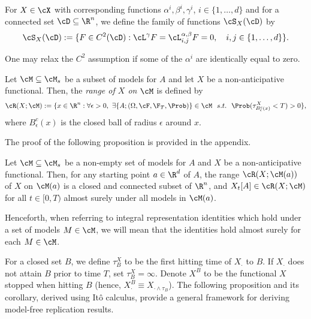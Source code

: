 \documentclass[11pt]{article}
\begin{document}
\begin{definition}
\label{definition: solution set to system of PDEs}
For $X \in \cX$ with corresponding functions $\alpha^i, \beta^i, \gamma^i$, $i \in \{1,\ldots,d\}$ and for a connected set $\cD \subseteq \R^n$, we define the family of functions $\cS_X(\cD)$ by
$$
\cS_X(\cD) := \{F \in C^2(\cD):  \cL^{\gamma} F = \cL^{\alpha,\beta}_{i,j} F = 0, \quad i,j \in \{1,\ldots,d\} \}.
$$
\end{definition}

One may relax the $C^2$ assumption if some of the $\alpha^i$ are identically equal to zero. 

\begin{definition}
\label{definition: range of X}
Let $\cM \subseteq \cM_s$ be a subset of models for $A$ and let $X$ be a non-anticipative functional. Then, the \textit{range of $X$ on $\cM$} is defined by 
$$
\cR(X; \cM) := \{ x \in \R^n : \forall \epsilon > 0, \ \exists \{A; (\Omega, \cF, \F_T, \Prob)\} \in \cM \ \ s.t. \ \ \Prob(\tau^X_{B^c_\epsilon(x)} < T) > 0 \},
$$
where $B^c_\epsilon(x)$ is the closed ball of radius $\epsilon$ around $x$.
\end{definition}

The proof of the following proposition is provided in the appendix.

\begin{proposition}
\label{proposition: properties of range of X}
Let $\cM \subseteq \cM_s$ be a non-empty set of models for $A$ and $X$ be a non-anticipative functional. Then, for any starting point $a \in \R^d$ of $A$, the range $\cR(X; \cM(a))$ of $X$ on $\cM(a)$ is a closed and connected subset of $\R^n$, and $X_t[A] \in \cR(X; \cM)$ for all $t \in [0,T)$ almost surely under all models in $\cM(a)$.
\end{proposition}

Henceforth, when referring to integral representation identities which hold under a set of models $M \in \cM$, we will mean that the identities hold almost surely for each $M \in \cM$. 

For a closed set $B$, we define $\tau^X_B$ to be the first hitting time of $X_\cdot$ to $B$. If $X_\cdot$ does not attain $B$ prior to time $T$, set $\tau^X_B = \infty$. Denote $X^B$ to be the functional $X$ stopped when hitting $B$ (hence, $X^B_\cdot \equiv X_{\cdot \wedge \tau_B}$). The following proposition and its corollary, derived using It\^o calculus, provide a general framework for deriving model-free replication results.
\end{document}
